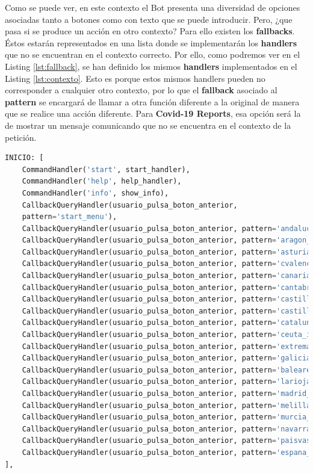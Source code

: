 Como se puede ver, en este contexto el Bot presenta una diversidad de opciones asociadas tanto a botones como con texto que se puede introducir. Pero, ¿que pasa si se produce un acción en otro contexto? Para ello existen los \textbf{fallbacks}. Éstos estarán representados en una lista donde se implementarán los \textbf{handlers} que no se encuentran en el contexto correcto. Por ello, como podremos ver en el Listing \ref{lst:fallback}, se han definido los mismos \textbf{handlers} implementados en el Listing \ref{lst:contexto}. Esto es porque estos mismos handlers pueden no corresponder a cualquier otro contexto, por lo que el \textbf{fallback} asociado al \textbf{pattern} se encargará de llamar a otra función diferente a la original de manera que se realice una acción diferente. Para \textbf{Covid-19 Reports}, esa opción será la de mostrar un mensaje comunicando que no se encuentra en el contexto de la petición.

\begin{lstlisting}[language=Python, caption={Fallbacks.}, label={lst:fallback}]
INICIO: [
	CommandHandler('start', start_handler),
	CommandHandler('help', help_handler),
	CommandHandler('info', show_info),
	CallbackQueryHandler(usuario_pulsa_boton_anterior,
	pattern='start_menu'),
	CallbackQueryHandler(usuario_pulsa_boton_anterior, pattern='andalucia_info'),
	CallbackQueryHandler(usuario_pulsa_boton_anterior, pattern='aragon_info'),
	CallbackQueryHandler(usuario_pulsa_boton_anterior, pattern='asturias_info'),
	CallbackQueryHandler(usuario_pulsa_boton_anterior, pattern='cvalenciana_info'),
	CallbackQueryHandler(usuario_pulsa_boton_anterior, pattern='canarias_info'),
	CallbackQueryHandler(usuario_pulsa_boton_anterior, pattern='cantabria_info'),
	CallbackQueryHandler(usuario_pulsa_boton_anterior, pattern='castillalamancha_info'),
	CallbackQueryHandler(usuario_pulsa_boton_anterior, pattern='castillayleon_info'),
	CallbackQueryHandler(usuario_pulsa_boton_anterior, pattern='cataluna_info'),
	CallbackQueryHandler(usuario_pulsa_boton_anterior, pattern='ceuta_info'),
	CallbackQueryHandler(usuario_pulsa_boton_anterior, pattern='extremadura_info'),
	CallbackQueryHandler(usuario_pulsa_boton_anterior, pattern='galicia_info'),
	CallbackQueryHandler(usuario_pulsa_boton_anterior, pattern='baleares_info'),
	CallbackQueryHandler(usuario_pulsa_boton_anterior, pattern='larioja_info'),
	CallbackQueryHandler(usuario_pulsa_boton_anterior, pattern='madrid_info'),
	CallbackQueryHandler(usuario_pulsa_boton_anterior, pattern='melilla_info'),
	CallbackQueryHandler(usuario_pulsa_boton_anterior, pattern='murcia_info'),
	CallbackQueryHandler(usuario_pulsa_boton_anterior, pattern='navarra_info'),
	CallbackQueryHandler(usuario_pulsa_boton_anterior, pattern='paisvasco_info'),
	CallbackQueryHandler(usuario_pulsa_boton_anterior, pattern='espana_info'),
],
\end{lstlisting}

